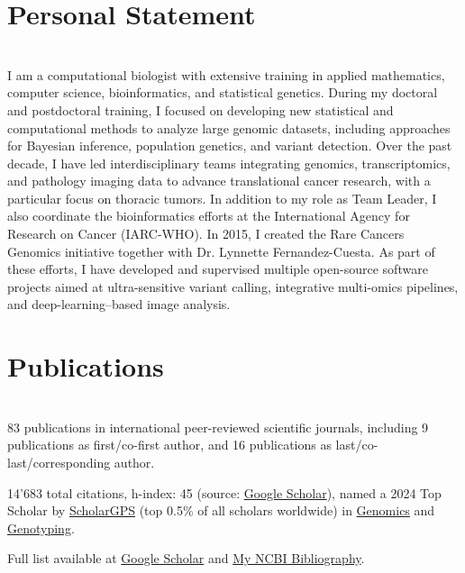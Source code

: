 \documentclass[10pt,a4paper]{article}
\begin{document}
\section{Personal Statement}
\ \\
I am a computational biologist with extensive training in applied mathematics, computer science,
bioinformatics, and statistical genetics. During my doctoral and postdoctoral training, I focused on
developing new statistical and computational methods to analyze large genomic datasets, including
approaches for Bayesian inference, population genetics, and variant detection. Over the past decade, I
have led interdisciplinary teams integrating genomics, transcriptomics, and pathology imaging data to
advance translational cancer research, with a particular focus on thoracic tumors. In addition to my role as Team Leader, I also coordinate the
bioinformatics efforts at the International Agency for Research on Cancer (IARC-WHO). In 2015, I created the Rare Cancers Genomics initiative
together with Dr. Lynnette Fernandez-Cuesta. As part of these efforts, I have developed and supervised
multiple open-source software projects aimed at ultra-sensitive variant calling, integrative multi-omics
pipelines, and deep-learning–based image analysis.

\section{Publications}
\ \\
83 publications in international peer-reviewed scientific journals, including 9 publications as first/co-first author, and 16 publications as last/co-last/corresponding author.

14'683 total citations, h-index: 45 (source: \href{https://scholar.google.com/citations?hl=en&user=vzZPQj8AAAAJ&view_op=list_works&sortby=pubdate}{Google Scholar}), named a 2024 Top Scholar by \href{https://scholargps.com/scholars/36665698545984/matthieu-foll}{ScholarGPS} (top 0.5\% of all scholars worldwide) in \href{https://scholargps.com/top-scholars?year=2024&ranking_duration=LIFETIME&specialty=Genomics&p=82&e_ref=be75210910e03c3129a7#1631}{Genomics} and \href{https://scholargps.com/top-scholars?year=2024&ranking_duration=LIFETIME&specialty=Genotyping&p=12&e_ref=be75210910e03c3129a7#236}{Genotyping}.

Full list available at \href{https://scholar.google.com/citations?hl=en&user=vzZPQj8AAAAJ&view_op=list_works&sortby=pubdate}{Google Scholar} and  \href{https://www.ncbi.nlm.nih.gov/myncbi/matthieu.foll.1/bibliography/public/}{My NCBI Bibliography}.
\end{document}
